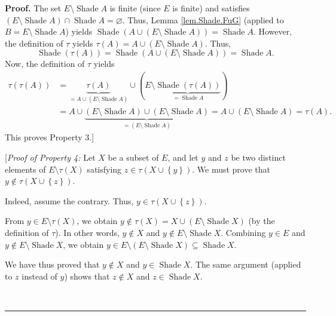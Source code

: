 \documentclass[numbers=enddot,12pt,final,onecolumn]{scrartcl}%
\theoremstyle{definition}
\newenvironment{proof}[1][Proof]{\noindent\textbf{#1.} }{\ \rule{0.5em}{0.5em}}
\newenvironment{verlong}{}{}
\begin{document}
\begin{verlong}
\begin{proof}
The set $E\setminus\operatorname*{Shade}A$ is finite (since $E$ is finite) and
satisfies $\left(  E\setminus\operatorname*{Shade}A\right)  \cap
\operatorname*{Shade}A=\varnothing$. Thus, Lemma \ref{lem.Shade.FuG} (applied
to $B=E\setminus\operatorname*{Shade}A$) yields \newline$\operatorname*{Shade}%
\left(  A\cup\left(  E\setminus\operatorname*{Shade}A\right)  \right)
=\operatorname*{Shade}A$. However, the definition of $\tau$ yields
$\tau\left(  A\right)  =A\cup\left(  E\setminus\operatorname*{Shade}A\right)
$. Thus,%
\[
\operatorname*{Shade}\left(  \tau\left(  A\right)  \right)
=\operatorname*{Shade}\left(  A\cup\left(  E\setminus\operatorname*{Shade}%
A\right)  \right)  =\operatorname*{Shade}A.
\]
Now, the definition of $\tau$ yields%
\begin{align*}
\tau\left(  \tau\left(  A\right)  \right)   &  =\underbrace{\tau\left(
A\right)  }_{=A\cup\left(  E\setminus\operatorname*{Shade}A\right)  }%
\cup\left(  E\setminus\underbrace{\operatorname*{Shade}\left(  \tau\left(
A\right)  \right)  }_{=\operatorname*{Shade}A}\right) \\
&  =A\cup\underbrace{\left(  E\setminus\operatorname*{Shade}A\right)
\cup\left(  E\setminus\operatorname*{Shade}A\right)  }_{=\left(
E\setminus\operatorname*{Shade}A\right)  }=A\cup\left(  E\setminus
\operatorname*{Shade}A\right)  =\tau\left(  A\right)  .
\end{align*}
This proves Property 3.]

[\textit{Proof of Property 4:} Let $X$ be a subset of $E$, and let $y$ and $z$
be two distinct elements of $E\setminus\tau\left(  X\right)  $ satisfying
$z\in\tau\left(  X\cup\left\{  y\right\}  \right)  $. We must prove that
$y\notin\tau\left(  X\cup\left\{  z\right\}  \right)  $.

Indeed, assume the contrary. Thus, $y\in\tau\left(  X\cup\left\{  z\right\}
\right)  $.

From $y\in E\setminus\tau\left(  X\right)  $, we obtain $y\notin\tau\left(
X\right)  =X\cup\left(  E\setminus\operatorname*{Shade}X\right)  $ (by the
definition of $\tau$). In other words, $y\notin X$ and $y\notin E\setminus
\operatorname*{Shade}X$. Combining $y\in E$ and $y\notin E\setminus
\operatorname*{Shade}X$, we obtain $y\in E\setminus\left(  E\setminus
\operatorname*{Shade}X\right)  \subseteq\operatorname*{Shade}X$.

We have thus proved that $y\notin X$ and $y\in\operatorname*{Shade}X$. The
same argument (applied to $z$ instead of $y$) shows that $z\notin X$ and
$z\in\operatorname*{Shade}X$.


\end{proof}
\end{verlong}
\end{document}

